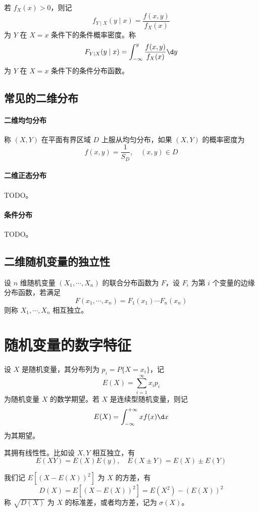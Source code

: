 若 $f_X(x) > 0$，则记
\[ f_{Y \mid X} (y \mid x) = \frac{f(x, y)}{f_{X}(x)} \]
为 $Y$ 在 $X = x$ 条件下的条件概率密度。称
\[ F_{Y \mid X}(y \mid x) = \int_{-\infty}^y \frac{f(x, y)}{f_{X}(x)} \d y \]
为 $Y$ 在 $X = x$ 条件下的条件分布函数。

\subsection{常见的二维分布}

\paragraph{二维均匀分布} 称 $(X,Y)$ 在平面有界区域 $D$ 上服从均匀分布，如果 $(X, Y)$ 的概率密度为
\[ f(x, y) = \frac{1}{S_D}, \quad (x, y) \in D \]

\paragraph{二维正态分布} TODO。

\paragraph{条件分布} TODO。

\subsection{二维随机变量的独立性}

设 $n$ 维随机变量 $(X_1, \cdots, X_n)$ 的联合分布函数为 $F$，设 $F_i$ 为第 $i$ 个变量的边缘分布函数，若满足
\[ F(x_1, \cdots, x_n) = F_1(x_1) \cdots F_n(x_n) \]
则称 $X_1, \cdots, X_n$ 相互独立。

\section{随机变量的数字特征}

设 $X$ 是随机变量，其分布列为 $p_i = P\{X = x_i\}$，记
\[ E(X) = \sum_{i=1}^\infty x_i p_i \]
为随机变量 $X$ 的数学期望。若 $X$ 是连续型随机变量，则记
\[ E(X) = \int_{-\infty}^{+\infty} x f(x) \d x \]
为其期望。

其拥有线性性。比如设 $X, Y$ 相互独立，有
\[ E(X Y) = E(X) E(y), \quad E(X \pm Y) = E(X) \pm E(Y) \]

我们记 $E[(X - E(X))^2]$ 为 $X$ 的方差，有
\[ D(X) = E[(X - E(X))^2] = E(X^2) - (E(X))^2 \]
称 $\sqrt{D(X)}$ 为 $X$ 的标准差，或者均方差，记为 $\sigma(X)$。

